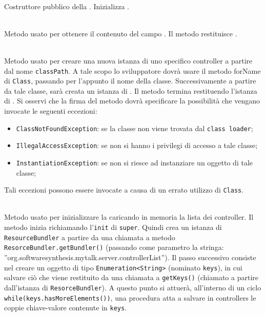 \begin{description}
	\item{}\\
	Costruttore pubblico della . Inizializza .
	
	\item{}\\
	Metodo usato per ottenere il contenuto del campo . Il metodo restituisce .
	
	\item{}\\
	Metodo usato per creare una nuova istanza di uno specifico controller a partire dal nome \texttt{classPath}. A tale scopo lo sviluppatore dovrà usare il metodo forName di \texttt{Class}, passando per l'appunto il nome della classe. Successivamente a partire da tale classe, sarà creata un istanza di . Il metodo termina restituendo l'istanza di . Si osservi che la firma del metodo dovrà specificare la possibilità che vengano invocate le seguenti eccezioni:
	\begin{itemize}
		\item \texttt{ClassNotFoundException}: se la classe non viene trovata dal \texttt{class loader};
		\item \texttt{IllegalAccessException}: se non si hanno i privilegi di accesso a tale classe;
		\item \texttt{InstantiationException}: se non si riesce ad instanziare un oggetto di tale classe;
	\end{itemize}
	
	Tali eccezioni possono essere invocate a causa di un errato utilizzo di \texttt{Class}.
	
	\item{}\\
	Metodo usato per inizializzare la  caricando in memoria la lista dei controller. Il metodo inizia richiamando l'\texttt{init} di \texttt{super}. Quindi crea un istanza di \texttt{ResourceBundler} a partire da una chiamata a metodo \texttt{ResorceBundler.getBundler()} (passando come parametro la stringa: ''org.softwaresynthesis.mytalk.server.controllerList''). Il passo successivo consiste nel creare un oggetto di tipo \texttt{Enumeration<String>} (nominato \texttt{keys}), in cui salvare ciò che viene restituito da una chiamata a \texttt{getKeys()} (chiamato a partire dall'istanza di \texttt{ResorceBundler}). A questo punto si attuerà, all'interno di un ciclo \verb|while(keys.hasMoreElements())|, una procedura atta a salvare in controllers le coppie chiave-valore contenute in \texttt{keys}.
	

\end{description}
